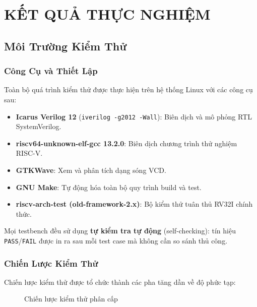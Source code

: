 \chapter{KẾT QUẢ THỰC NGHIỆM}
\label{Chapter5}

\section{Môi Trường Kiểm Thử}

\subsection{Công Cụ và Thiết Lập}

Toàn bộ quá trình kiểm thử được thực hiện trên hệ thống Linux với các công cụ sau:

\begin{itemize}
    \item \textbf{Icarus Verilog 12} (\texttt{iverilog -g2012 -Wall}): Biên dịch và mô phỏng RTL SystemVerilog.
    \item \textbf{riscv64-unknown-elf-gcc 13.2.0}: Biên dịch chương trình thử nghiệm RISC-V.
    \item \textbf{GTKWave}: Xem và phân tích dạng sóng VCD.
    \item \textbf{GNU Make}: Tự động hóa toàn bộ quy trình build và test.
    \item \textbf{riscv-arch-test (old-framework-2.x)}: Bộ kiểm thử tuân thủ RV32I chính thức.
\end{itemize}

Mọi testbench đều sử dụng \textbf{tự kiểm tra tự động} (self-checking): tín hiệu \texttt{PASS}/\texttt{FAIL} được in ra sau mỗi test case mà không cần so sánh thủ công.

\subsection{Chiến Lược Kiểm Thử}

Chiến lược kiểm thử được tổ chức thành các pha tăng dần về độ phức tạp:

\begin{figure}[htp]
\centering
{}
\caption{Chiến lược kiểm thử phân cấp}
\label{fig:test-pyramid}
\end{figure}

